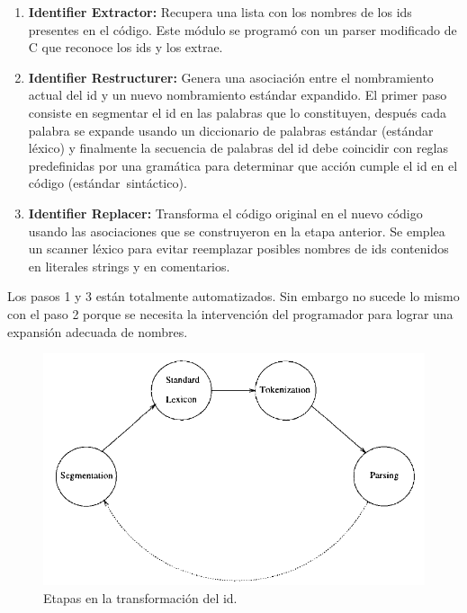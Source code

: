\documentclass[a4paper,12pt]{report}
\begin{document}
\begin{enumerate}
\itemsep0em%
\item \textbf{Identifier Extractor:} Recupera una lista con los nombres de los ids presentes en el código. Este módulo se programó con un parser modificado de C que reconoce los ids y los extrae.
\item \textbf{Identifier Restructurer:} Genera una asociación entre el nombramiento actual del id y un nuevo nombramiento estándar expandido. El primer paso consiste en segmentar el id en las palabras que lo constituyen, después cada palabra se expande usando un diccionario de palabras estándar (estándar léxico) y finalmente la secuencia de palabras del id debe coincidir con reglas predefinidas por una gramática para determinar que acción cumple el id en el código \mbox{(estándar sintáctico).}
\item \textbf{Identifier Replacer:} Transforma el código original en el nuevo código usando las asociaciones que se construyeron en la etapa anterior. Se emplea un scanner léxico para evitar reemplazar posibles nombres de ids contenidos en literales strings y en comentarios.
\end{enumerate}

Los pasos 1 y 3 están totalmente automatizados. Sin embargo no sucede lo mismo con el paso 2 porque se necesita la intervención del programador para lograr una expansión adecuada de nombres.

\begin{figure}[h] %
\centering
\includegraphics[scale= 0.60]{./ire_2.png}
\caption{Etapas en la transformación del id.}
\label{ire2}
\end{figure}
\end{document}
